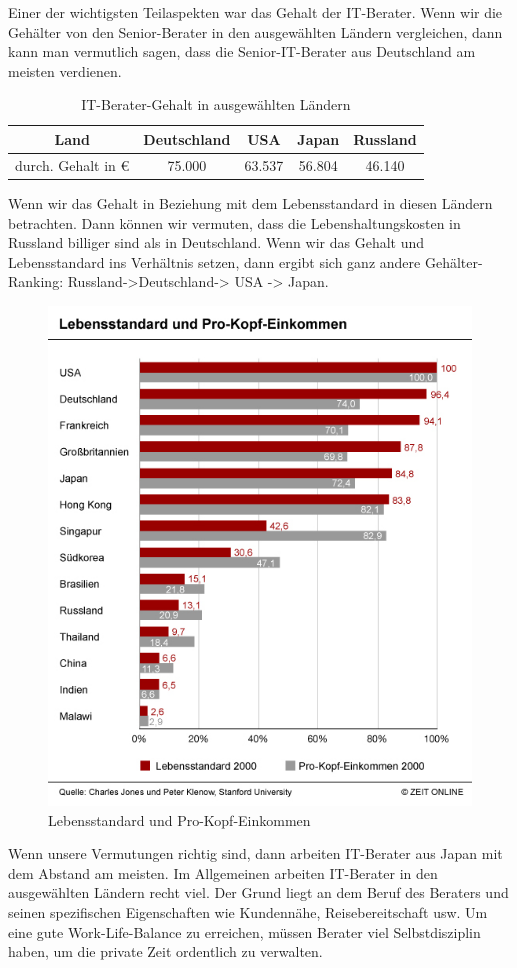 Einer der wichtigsten Teilaspekten war das Gehalt der IT-Berater. Wenn wir die Gehälter von den Senior-Berater in den ausgewählten Ländern vergleichen, dann kann man vermutlich sagen, dass die Senior-IT-Berater aus Deutschland am meisten verdienen.
\begin{table}[htp]

\begin{tabular}{|c|c|c|c|c|}
\hline Land & Deutschland & USA & Japan &  Russland\\ 
\hline durch. Gehalt in € & 75.000 & 63.537 & 56.804 &  46.140\\ 
\hline 
\end{tabular} 
\caption{IT-Berater-Gehalt in ausgewählten Ländern}
\end{table}

Wenn wir das Gehalt in Beziehung mit dem Lebensstandard	in diesen Ländern betrachten. Dann können wir vermuten, dass die Lebenshaltungskosten in Russland billiger sind als in Deutschland. Wenn wir das Gehalt und Lebensstandard ins Verhältnis setzen, dann ergibt sich ganz andere Gehälter-Ranking: Russland->Deutschland-> USA -> Japan.
\begin{figure}[ht]
		\centering
		\includegraphics[width=0.7\linewidth]{./images/Lebensstandard-Pro-Kopf-Einkommen}
		\caption{Lebensstandard und Pro-Kopf-Einkommen \cite{LebensStd}}
		\label{fig:LebStdProKEink}
		\end{figure}
Wenn unsere Vermutungen richtig sind, dann arbeiten IT-Berater aus Japan mit dem Abstand am meisten. Im Allgemeinen arbeiten IT-Berater in den ausgewählten Ländern recht viel. Der Grund liegt an dem Beruf des Beraters und seinen spezifischen Eigenschaften wie Kundennähe, Reisebereitschaft usw. Um eine gute Work-Life-Balance zu erreichen, müssen Berater viel Selbstdisziplin haben, um die private Zeit ordentlich zu verwalten.\\
